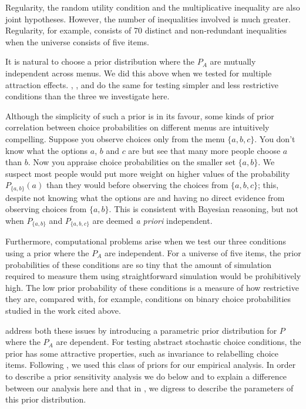 \documentclass[11pt,letter]{article}
\newcommand{\menu}{menu}
\newcommand{\menus}{menus}
\begin{document}
Regularity, the random utility condition and the multiplicative inequality are also joint hypotheses.
However, the number of inequalities involved is much greater.
Regularity, for example, consists of 70 distinct and non-redundant inequalities when the universe consists of five items.

It is natural to choose a prior distribution where the $P_A$ are mutually independent across \menus{}.
We did this above when we tested for multiple attraction effects.
\citet{CavaDavi14}, \citet{DaviBrowCava15}, \citet{MyunKaraIver05} and \citet{ZwilCavaRege11} do the same for testing simpler and less restrictive conditions than the three we investigate here.

Although the simplicity of such a prior is in its favour, some kinds of prior correlation between choice probabilities on different \menus{} are intuitively compelling.
Suppose you observe choices only from the \menu{} $\{a,b,c\}$.
You don't know what the options $a$, $b$ and $c$ are but see that many more people choose $a$ than $b$.
Now you appraise choice probabilities on the smaller set $\{a,b\}$.
We suspect most people would put more weight on higher values of the probability $P_{\{a,b\}}(a)$ than they would before observing the choices from $\{a,b,c\}$; this, despite not knowing what the options are and having no direct evidence from observing choices from $\{a,b\}$.
This is consistent with Bayesian reasoning, but not when $P_{\{a,b\}}$ and $P_{\{a,b,c\}}$ are deemed {\em a priori} independent.

Furthermore, computational problems arise when we test our three conditions using a prior where the $P_A$ are independent.
For a universe of five items, the prior probabilities of these conditions are so tiny that the amount of simulation required to measure them using straightforward simulation would be prohibitively high.
The low prior probability of these conditions is a measure of how restrictive they are, compared with, for example, conditions on binary choice probabilities studied in the work cited above.

\citet{McCaMarl13} address both these issues by introducing a parametric prior distribution for $P$ where the $P_A$ are dependent.
For testing abstract stochastic choice conditions, the prior has some attractive properties, such as invariance to relabelling choice items.
Following \citet{McCaMarl14}, we used this class of priors for our empirical analysis.
In order to describe a prior sensitivity analysis we do below and to explain a difference between our analysis here and that in \citet{McCaMarl14}, we digress to describe the parameters of this prior distribution.
\end{document}

